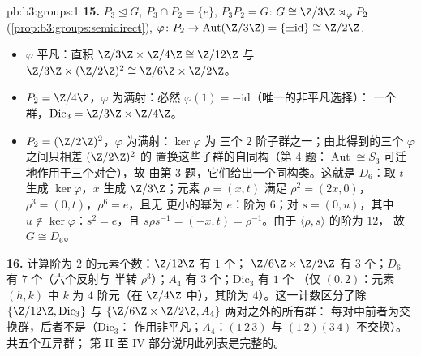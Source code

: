 \begin{solution}{pb:b3:groups:1}
\textbf{15.} $P_3 \trianglelefteq G$, $P_3 \cap P_2 = \{e\}$,
$P_3P_2 = G$: $G \cong \Z/3\Z \rtimes_\varphi P_2$
(\cref{prop:b3:groups:semidirect}), $\varphi \colon P_2 \to
\operatorname{Aut}(\Z/3\Z) = \{\pm\mathrm{id}\} \cong \Z/2\Z$.
\begin{itemize}
  \item $\varphi$ 平凡：直积 $\Z/3\Z \times \Z/4\Z
        \cong \Z/12\Z$ 与 $\Z/3\Z \times (\Z/2\Z)^2 \cong \Z/6\Z
        \times \Z/2\Z$。
  \item $P_2 = \Z/4\Z$，$\varphi$ 为满射：必然
        $\varphi(1) = -\mathrm{id}$（唯一的非平凡选择）：
        一个群，$\mathrm{Dic}_3 = \Z/3\Z \rtimes \Z/4\Z$。
  \item $P_2 = (\Z/2\Z)^2$，$\varphi$ 为满射：$\ker\varphi$ 为
        三个 $2$ 阶子群之一；由此得到的三个
        $\varphi$ 之间只相差 $(\Z/2\Z)^2$ 的
        置换这些子群的自同构（第 4 题：$\operatorname{Aut}
        \cong S_3$ 可迁地作用于三个对合），故
        由第 3 题，它们给出一个同构类。这就是
        $D_6$：取 $t$ 生成 $\ker\varphi$，$x$
        生成 $\Z/3\Z$；元素 $\rho = (x, t)$ 满足
        $\rho^2 = (2x, 0)$，$\rho^3 = (0, t)$，$\rho^6 = e$，且无
        更小的幂为 $e$：阶为 $6$；对 $s = (0, u)$，其中 $u
        \notin \ker\varphi$：$s^2 = e$，且 $s\rho s^{-1} = (-x, t)
        = \rho^{-1}$。由于 $\langle \rho, s\rangle$ 的阶为 $12$，
        故 $G \cong D_6$。
\end{itemize}

\textbf{16.} 计算阶为 $2$ 的元素个数：$\Z/12\Z$ 有 $1$ 个；
$\Z/6\Z\times\Z/2\Z$ 有 $3$ 个；$D_6$ 有 $7$ 个（六个反射与
半转 $\rho^3$）；$A_4$ 有 $3$ 个；$\mathrm{Dic}_3$ 有 $1$ 个
（仅 $(0, 2)$：元素 $(h, k)$ 中 $k$ 为 $4$ 阶元（在
$\Z/4\Z$ 中），其阶为 $4$）。这一计数区分了除
$\{\Z/12\Z, \mathrm{Dic}_3\}$ 与 $\{\Z/6\Z\times\Z/2\Z, A_4\}$ 两对之外的所有群：
每对中前者为交换群，后者不是（$\mathrm{Dic}_3$：
作用非平凡；$A_4$：$(1\,2\,3)$ 与
$(1\,2)(3\,4)$ 不交换）。共五个互异群；
第 II 至 IV 部分说明此列表是完整的。


\end{solution}
